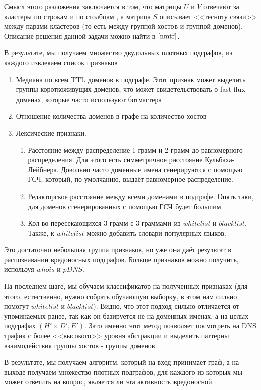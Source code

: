 \documentclass[14pt]{extreport}
\begin{document}
	Смысл этого разложения заключается в том, что матрицы $U$ и $V$ отвечают за кластеры по строкам и по столбцам , а матрица $S$ описывает <<тесноту связи>> между парами кластеров (то есть между группой хостов и группой доменов). Описание решения данной задачи можно найти в $\cite{nmtf}$.
	
	В результате, мы получаем множество двудольных плотных подграфов, из каждого извлекаем список признаков
	
	\begin{enumerate}
		\item Медиана по всем TTL доменов в подграфе. Этот признак может выделить группы короткоживущих доменов, что может свидетельствовать о fast-flux доменах, которые часто используют ботмастера
		\item Отношение количества доменов в графе на количество хостов
		\item Лексические признаки.
		\begin{enumerate}
			\item Расстояние между распределение 1-грамм и 2-грамм до равномерного распределения. Для этого есть симметричное расстояние Кульбаха-Лейбнера. Довольно часто доменные имена генерируются с помощью ГСЧ, который, по умолчанию, выдаёт равномерное распределение.
			\item Редакторское расстояние между всеми доменами в подграфе. Опять таки, для доменов сгенерированных с помощью ГСЧ будет большим.
			\item Кол-во пересекающихся 3-грамм с 3-граммами из $whitelist$ и $blacklist$. Также, к $whitelist$ можно добавить словари популярных языков.
		\end{enumerate}
	\end{enumerate}  

	Это достаточно небольшая группа признаков, но уже она даёт результат в распознавании вредоносных подграфов. Больше признаков можно получить, используя $whois$ и $pDNS$.
	
	На последнем шаге, мы обучаем классификатор на полученных признаках (для этого, естественно, нужно собрать обучающую выборку, в этом нам сильно помогут $whitelist$ и $blacklist$). Видно, что этот подход сильно отличается от упоминаемых ранее, так как он базируется не на доменных именах, а на целых подграфах $(H' \times D', E')$. Зато именно этот метод позволяет посмотреть на DNS трафик с более <<высокого>> уровня абстракции и выделить паттерны взаимодействия группы хостов - группы доменов.
	
	В результате, мы получаем алгоритм, который на вход принимает граф, а на выходе получаем множество плотных подграфов, для каждого из которых мы может ответить на вопрос, является ли эта активность вредоносной.
	
\end{document}
